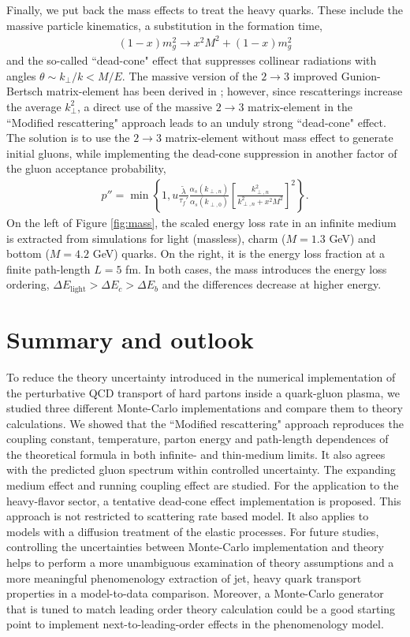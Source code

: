 \documentclass[aps, prc, reprint, amsmath, groupedaddress, nofootinbib]{revtex4-1}
\begin{document}
Finally, we put back the mass effects to treat the heavy quarks. These include the massive particle kinematics, a substitution in the formation time,
\begin{eqnarray}
(1-x)m_g^2 \rightarrow x^2M^2 + (1-x)m_g^2
\end{eqnarray}
and the so-called ``dead-cone" effect that suppresses collinear radiations with angles $\theta \sim k_\perp/k < M/E$. 
The massive version of the $2\rightarrow3$ improved Gunion-Bertsch matrix-element has been derived in \cite{Uphoff:2014hza}; however, since rescatterings increase the average $k_{\perp}^2$, a direct use of the massive $2\rightarrow3$ matrix-element in the ``Modified rescattering" approach leads to an unduly strong ``dead-cone" effect.
The solution is to use the $2\rightarrow3$ matrix-element without mass effect to generate initial gluons, while implementing the dead-cone suppression in another factor of the gluon acceptance probability,
\begin{eqnarray}
p'' = \min\left\{1, u\frac{\tilde{\lambda}}{\tau_f'}\frac{\alpha_s(k_{\perp,n})}{\alpha_s(k_{\perp,0})} \left[\frac{k_{\perp,n}^2}{k_{\perp,n}^2+x^2 M^2}\right]^2\right\}.
\end{eqnarray}
On the left of Figure \ref{fig:mass}, the scaled energy loss rate in an infinite medium is extracted from simulations for light (massless), charm ($M=1.3$ GeV) and bottom ($M=4.2$ GeV) quarks. 
On the right, it is the energy loss fraction at a finite path-length $L=5$ fm.
In both cases, the mass introduces the energy loss ordering, $\Delta E_{\textrm{light}} > \Delta E_c > \Delta E_b$ and the differences decrease at higher energy.

\section{Summary and outlook}\label{section:summary}
To reduce the theory uncertainty introduced in the numerical implementation of the perturbative QCD transport of hard partons inside a quark-gluon plasma, we studied three different Monte-Carlo implementations and compare them to theory calculations.
We showed that the ``Modified rescattering" approach reproduces the coupling constant, temperature, parton energy and path-length dependences of the theoretical formula in both infinite- and thin-medium limits.
It also agrees with the predicted gluon spectrum within controlled uncertainty.
The expanding medium effect and running coupling effect are studied. For the application to the heavy-flavor sector, a tentative dead-cone effect implementation is proposed.
This approach is not restricted to scattering rate based model. 
It also applies to models with a diffusion treatment of the elastic processes. 
For future studies, controlling the uncertainties between Monte-Carlo implementation and theory helps to perform a more unambiguous examination of theory assumptions and a more meaningful phenomenology extraction of jet, heavy quark transport properties in a model-to-data comparison.
Moreover, a Monte-Carlo generator that is tuned to match leading order theory calculation could be a good starting point to implement next-to-leading-order effects in the phenomenology model.
\end{document}

